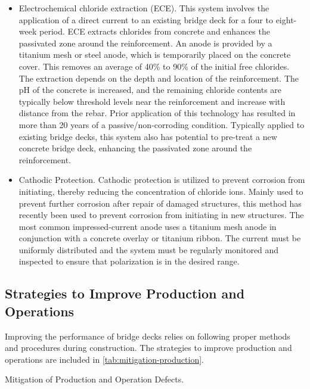 \begin{itemize}
  \item Electrochemical chloride extraction (ECE). This system involves the application of a direct current to an
  existing bridge deck for a four to eight-week period. ECE extracts chlorides from concrete and enhances the passivated zone around the reinforcement. An anode is provided by a titanium mesh or steel anode, which is
  temporarily placed on the concrete cover. This removes an average of 40\% to 90\% of the initial free
  chlorides. The extraction depends on the depth and location of the reinforcement. The pH of the concrete is
  increased, and the remaining chloride contents are typically below threshold levels near the reinforcement
  and increase with distance from the rebar. Prior application of this technology has resulted in more than 20
  years of a passive/non-corroding condition. Typically applied to existing bridge decks, this system also has
  potential to pre-treat a new concrete bridge deck, enhancing the passivated zone around the reinforcement.
  \item Cathodic Protection. Cathodic protection is utilized to prevent corrosion from initiating, thereby reducing the
  concentration of chloride ions. Mainly used to prevent further corrosion after repair of damaged structures,
  this method has recently been used to prevent corrosion from initiating in new structures. The most common
  impressed-current anode uses a titanium mesh anode in conjunction with a concrete overlay or titanium
  ribbon. The current must be uniformly distributed and the system must be regularly monitored and inspected
  to ensure that polarization is in the desired range.
\end{itemize}

\subsection{Strategies to Improve Production and Operations}
\label{subsec:strategies-improve-operation}
Improving the performance of bridge decks relies on following proper methods and procedures during
construction. The strategies to improve production and operations are included in \cref{tab:mitigation-production}.

\begin{table}
  \caption{Mitigation of Production and Operation Defects.}
  \label{tab:mitigation-production}
\end{table}

